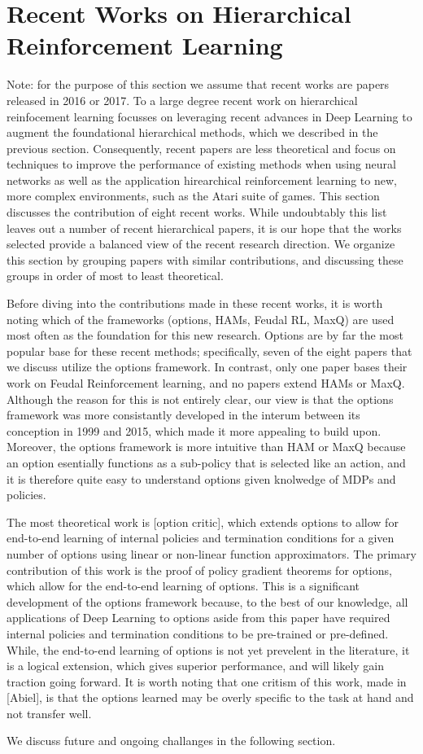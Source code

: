 \section{Recent Works on Hierarchical Reinforcement Learning}
Note: for the purpose of this section we assume that recent works are papers released in 2016 or 2017.
To a large degree recent work on hierarchical reinfocement learning focusses on leveraging recent advances in
Deep Learning to augment the foundational hierarchical methods, which we described in the previous section.
Consequently, recent papers are less theoretical and focus on techniques to improve the performance
of existing methods when using neural networks as well as the application hirearchical reinforcement learning
to new, more complex environments, such as the Atari suite of games.
This section discusses the contribution of eight recent works. While undoubtably this list leaves out a number
of recent hierarchical papers, it is our hope that the works selected provide a balanced view of the recent
research direction. We organize this section by grouping papers with similar contributions, and discussing
these groups in order of most to least theoretical.

Before diving into the contributions made in these recent works, it is worth noting which of the frameworks
(options, HAMs, Feudal RL, MaxQ) are used most often as the foundation for this new research.
Options are by far the most popular base for these recent methods; specifically, seven of the eight
papers that we discuss utilize the options framework. In contrast, only one paper bases their work
on Feudal Reinforcement learning, and no papers extend HAMs or MaxQ. Although the reason for this is
not entirely clear, our view is that the options framework was more consistantly developed in the interum
between its conception in 1999 and 2015, which made it more appealing to build upon. Moreover, the options
framework is more intuitive than HAM or MaxQ because an option esentially functions as a sub-policy that is
selected like an action, and it is therefore quite easy to understand options given knolwedge of MDPs and policies.

The most theoretical work is [option critic], which extends options to allow for end-to-end learning
of internal policies and termination conditions for a given number of options using
linear or non-linear function approximators. The primary contribution of this work is the proof
of policy gradient theorems for options, which allow for the end-to-end learning of options.
This is a significant development of the options framework because, to the best of our knowledge,
all applications of Deep Learning to options aside from this paper have required internal policies
and termination conditions to be pre-trained or pre-defined. While, the end-to-end learning of options
is not yet prevelent in the literature, it is a logical extension, which gives superior performance, and
will likely gain traction going forward. It is worth noting that one critism of this work,
made in [Abiel], is that the options learned may be overly specific to the task at hand and not transfer well.

We discuss future and ongoing challanges in the following section.
